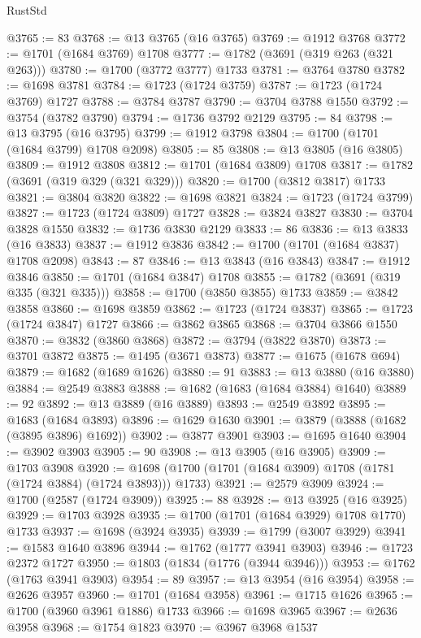 \begin{lexlean}{RustStd}
\begin{coremodule}
@3765 := 83
@3768 := @13 @3765 (@16 @3765)
@3769 := @1912 @3768
@3772 := @1701 (@1684 @3769) @1708
@3777 := @1782 (@3691 (@319 @263 (@321 @263)))
@3780 := @1700 (@3772 @3777) @1733
@3781 := @3764 @3780
@3782 := @1698 @3781
@3784 := @1723 (@1724 @3759)
@3787 := @1723 (@1724 @3769) @1727
@3788 := @3784 @3787
@3790 := @3704 @3788 @1550
@3792 := @3754 (@3782 @3790)
@3794 := @1736 @3792 @2129
@3795 := 84
@3798 := @13 @3795 (@16 @3795)
@3799 := @1912 @3798
@3804 := @1700 (@1701 (@1684 @3799) @1708 @2098)
@3805 := 85
@3808 := @13 @3805 (@16 @3805)
@3809 := @1912 @3808
@3812 := @1701 (@1684 @3809) @1708
@3817 := @1782 (@3691 (@319 @329 (@321 @329)))
@3820 := @1700 (@3812 @3817) @1733
@3821 := @3804 @3820
@3822 := @1698 @3821
@3824 := @1723 (@1724 @3799)
@3827 := @1723 (@1724 @3809) @1727
@3828 := @3824 @3827
@3830 := @3704 @3828 @1550
@3832 := @1736 @3830 @2129
@3833 := 86
@3836 := @13 @3833 (@16 @3833)
@3837 := @1912 @3836
@3842 := @1700 (@1701 (@1684 @3837) @1708 @2098)
@3843 := 87
@3846 := @13 @3843 (@16 @3843)
@3847 := @1912 @3846
@3850 := @1701 (@1684 @3847) @1708
@3855 := @1782 (@3691 (@319 @335 (@321 @335)))
@3858 := @1700 (@3850 @3855) @1733
@3859 := @3842 @3858
@3860 := @1698 @3859
@3862 := @1723 (@1724 @3837)
@3865 := @1723 (@1724 @3847) @1727
@3866 := @3862 @3865
@3868 := @3704 @3866 @1550
@3870 := @3832 (@3860 @3868)
@3872 := @3794 (@3822 @3870)
@3873 := @3701 @3872
@3875 := @1495 (@3671 @3873)
@3877 := @1675 (@1678 @694)
@3879 := @1682 (@1689 @1626)
@3880 := 91
@3883 := @13 @3880 (@16 @3880)
@3884 := @2549 @3883
@3888 := @1682 (@1683 (@1684 @3884) @1640)
@3889 := 92
@3892 := @13 @3889 (@16 @3889)
@3893 := @2549 @3892
@3895 := @1683 (@1684 @3893)
@3896 := @1629 @1630
@3901 := @3879 (@3888 (@1682 (@3895 @3896) @1692))
@3902 := @3877 @3901
@3903 := @1695 @1640
@3904 := @3902 @3903
@3905 := 90
@3908 := @13 @3905 (@16 @3905)
@3909 := @1703 @3908
@3920 := @1698 (@1700 (@1701 (@1684 @3909) @1708 (@1781 (@1724 @3884) (@1724 @3893))) @1733)
@3921 := @2579 @3909
@3924 := @1700 (@2587 (@1724 @3909))
@3925 := 88
@3928 := @13 @3925 (@16 @3925)
@3929 := @1703 @3928
@3935 := @1700 (@1701 (@1684 @3929) @1708 @1770) @1733
@3937 := @1698 (@3924 @3935)
@3939 := @1799 (@3007 @3929)
@3941 := @1583 @1640 @3896
@3944 := @1762 (@1777 @3941 @3903)
@3946 := @1723 @2372 @1727
@3950 := @1803 (@1834 (@1776 (@3944 @3946)))
@3953 := @1762 (@1763 @3941 @3903)
@3954 := 89
@3957 := @13 @3954 (@16 @3954)
@3958 := @2626 @3957
@3960 := @1701 (@1684 @3958)
@3961 := @1715 @1626
@3965 := @1700 (@3960 @3961 @1886) @1733
@3966 := @1698 @3965
@3967 := @2636 @3958
@3968 := @1754 @1823
@3970 := @3967 @3968 @1537

\end{coremodule}
\end{lexlean}

